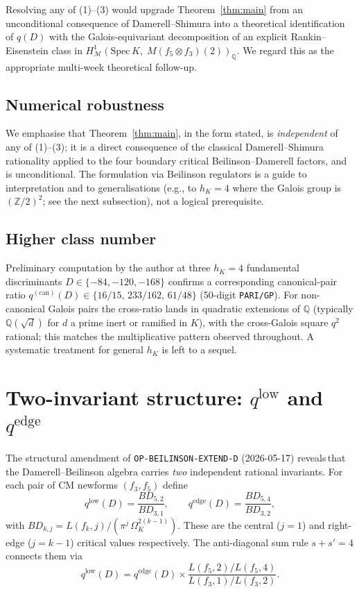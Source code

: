 \documentclass[11pt,a4paper]{amsart}
\theoremstyle{plain}
\theoremstyle{definition}
\newcommand{\Q}{\mathbb{Q}}
\newcommand{\Z}{\mathbb{Z}}
\newcommand{\Spec}{\mathrm{Spec}\,}
\begin{document}
Resolving any of (1)--(3) would upgrade Theorem~\ref{thm:main} from an
unconditional consequence of Damerell--Shimura into a theoretical
identification of $q(D)$ with the Galois-equivariant decomposition of an
explicit Rankin--Eisenstein class in
$H^{1}_{\mathcal M}(\Spec K,\; M(f_5\otimes f_3)(2))_{\Q}$. We regard
this as the appropriate multi-week theoretical follow-up.

\subsection{Numerical robustness}

We emphasise that Theorem~\ref{thm:main}, in the form stated, is
\emph{independent} of any of (1)--(3); it is a direct consequence of the
classical Damerell--Shimura rationality applied to the four boundary
critical Beilinson--Damerell factors, and is unconditional. The
formulation via Beilinson regulators is a guide to interpretation and to
generalisations (e.g., to $h_K=4$ where the Galois group is
$(\Z/2)^{2}$; see the next subsection), not a logical prerequisite.

\subsection{Higher class number}

Preliminary computation by the author at three $h_K=4$ fundamental
discriminants $D\in\{-84,-120,-168\}$ confirms a corresponding canonical-pair
ratio
$q^{(\mathrm{can})}(D)\in\{16/15,\,233/162,\,61/48\}$ (50-digit
\texttt{PARI/GP}). For non-canonical Galois pairs the cross-ratio lands in
quadratic extensions of $\Q$ (typically $\Q(\sqrt{d})$ for $d$ a prime
inert or ramified in $K$), with the cross-Galois square $q^{2}$ rational;
this matches the multiplicative pattern observed throughout. A
systematic treatment for general $h_K$ is left to a sequel.

\section{Two-invariant structure: $q^{\text{low}}$ and $q^{\text{edge}}$}\label{sec:two-invariant}

The structural amendment of \texttt{OP-BEILINSON-EXTEND-D} (2026-05-17) reveals\,that the Damerell--Beilinson algebra carries \emph{two} independent rational invariants. For each pair of CM newforms $(f_3,f_5)$ define
\[
  q^{\text{low}}(D)=\frac{BD_{5,2}}{BD_{3,1}},\qquad
  q^{\text{edge}}(D)=\frac{BD_{5,4}}{BD_{3,2}},
\]
with $BD_{k,j}=L(f_k,j)/(\pi^{j}\,\Omega_K^{2(k-1)})$. These are the central ($j=1$) and right-edge ($j=k-1$) critical values respectively. The anti-diagonal sum rule $s+s'=4$ connects them via
\[
  q^{\text{low}}(D)=q^{\text{edge}}(D)\times\frac{L(f_5,2)/L(f_5,4)}{L(f_3,1)/L(f_3,2)}.
\]
\end{document}
